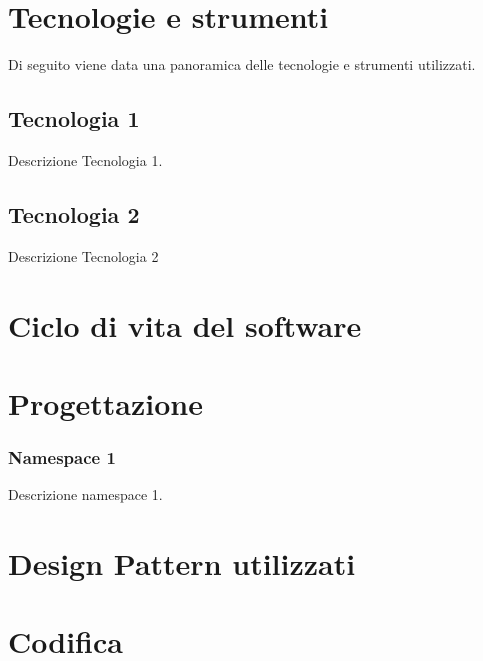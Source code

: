 
\section{Tecnologie e strumenti}
\label{sec:tecnologie-strumenti}

Di seguito viene data una panoramica delle tecnologie e strumenti utilizzati.

\subsection*{Tecnologia 1}
Descrizione Tecnologia 1.

\subsection*{Tecnologia 2}
Descrizione Tecnologia 2

\section{Ciclo di vita del software}
\label{sec:ciclo-vita-software}

\section{Progettazione}
\label{sec:progettazione}

\subsubsection{Namespace 1} %
Descrizione namespace 1.

\begin{namespacedesc}
\end{namespacedesc}


\section{Design Pattern utilizzati}

\section{Codifica}
